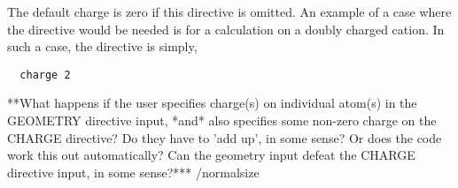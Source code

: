 The default charge is zero if this directive is omitted.  An example of
a case where the directive would be needed is for a calculation on a
 doubly charged cation.  In such a case, the directive is simply,
\begin{verbatim}
  charge 2
\end{verbatim}

\Large
**What happens if the user specifies charge(s) on individual atom(s) in the
GEOMETRY directive input, *and* also specifies some non-zero charge on the
CHARGE directive?  Do they have to 'add up', in some sense?  Or does the
code work this out automatically?  Can the geometry input defeat the
CHARGE directive input, in some sense?***
/normalsize

